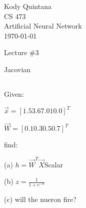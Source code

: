 \documentclass[14pt]{article}
\newcommand{\question}{\begin{tcolorbox}[boxrule=0.5pt, colback=backgrey, colframe=bordergrey, sharpish corners]\subsection{}}
\newcommand{\closequestion}{\end{tcolorbox}}
\begin{document}
\begin{flushleft}
 
\large
Kody Quintana\\
CS 473\\
Artificial Neural Network\\
\today\\
\boldmath

\begin{center}
Lecture \#3
\end{center}

Jacovian
\question
Given:

$\vec{x} = [1.5 3.6 7.0 10.0]^T
$

$\vec{W} = [0.1 0.3 0.5 0.7]^T
$

find:

(a) $h = \vec{W}^T \vec{X} $Scalar

(b) $z = \frac
	{1}
	{1 + e^{-h}}$

(c) will the nueron fire?
\closequestion

\end{flushleft}
\end{document}

